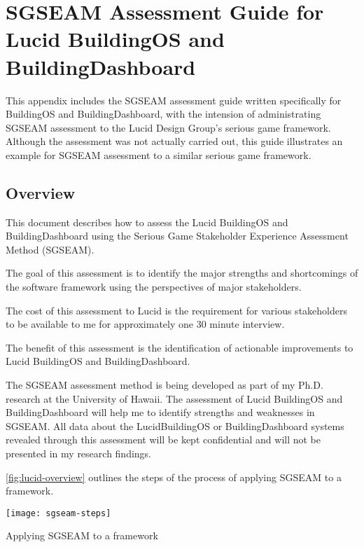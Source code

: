 \chapter{SGSEAM Assessment Guide for Lucid BuildingOS and
BuildingDashboard}
\label{app:sgseam-lucid-guide}

This appendix includes the SGSEAM assessment guide written specifically for BuildingOS and BuildingDashboard, with the intension of administrating SGSEAM assessment to the Lucid Design Group's serious game framework. Although the assessment was not actually carried out, this guide illustrates an example for SGSEAM assessment to a similar serious game framework.

\section{Overview}

This document describes how to assess the Lucid BuildingOS and
BuildingDashboard using the Serious Game Stakeholder Experience
Assessment Method (SGSEAM). 

The goal of this assessment is to identify the major strengths and
shortcomings of the software framework using the perspectives of major
stakeholders. 

The cost of this assessment to Lucid is the requirement for various
stakeholders to be available to me for approximately one 30 minute interview. 

The benefit of this assessment is the identification of actionable
improvements to Lucid BuildingOS and BuildingDashboard.

The SGSEAM assessment method is being developed as part of my
Ph.D. research at the University of Hawaii.  The assessment of Lucid
BuildingOS and BuildingDashboard will help me to identify strengths
and weaknesses in SGSEAM.  All data about the LucidBuildingOS or
BuildingDashboard systems revealed through this assessment will be kept
confidential and will not be presented in my research findings. 

\autoref{fig:lucid-overview} outlines the steps of the process of applying SGSEAM to a framework.

\begin{table}[ht!]
  \center
  \texttt{[image: sgseam-steps]}
  \caption{Applying SGSEAM to a framework}
  \label{fig:lucid-overview}
\end{table}

